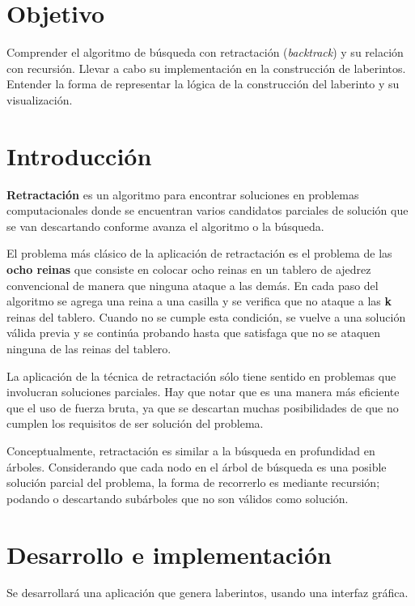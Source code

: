 

\section{Objetivo}
Comprender el algoritmo de búsqueda con retractación (\textit{backtrack}) y su relación con recursión. Llevar a cabo su implementación en la construcción de laberintos. Entender la forma de representar la lógica de la construcción del laberinto y su visualización. \par

\section{Introducci\'on}
\textbf{Retractación} es un algoritmo para encontrar soluciones en problemas computacionales donde se encuentran varios candidatos parciales de solución que se van descartando conforme avanza el algoritmo o la búsqueda.

El problema más clásico de la aplicación de retractación es el problema de las \textbf{ocho reinas} que consiste en colocar ocho reinas en un tablero de ajedrez convencional de manera que ninguna ataque a las demás. En cada paso del algoritmo se agrega una reina a una casilla y se verifica que no ataque a las \textbf{k} reinas del tablero. Cuando no se cumple esta condición, se vuelve a una solución válida previa y se continúa probando hasta que satisfaga que no se ataquen ninguna de las reinas del tablero.\par

La aplicación de la técnica de retractación sólo tiene sentido en problemas que involucran soluciones parciales. Hay que notar que es una manera más eficiente que el uso de fuerza bruta, ya que se descartan muchas posibilidades de que no cumplen los requisitos de ser solución del problema.

Conceptualmente, retractación es similar a la búsqueda en profundidad en árboles. Considerando que cada nodo en el árbol de búsqueda es una posible solución parcial del problema, la forma de recorrerlo es mediante recursión; podando o descartando subárboles que no son válidos como solución.\par


\section{Desarrollo e implementaci\'on}

\noindent Se desarrollará una aplicación que genera laberintos, usando una interfaz gráfica.

